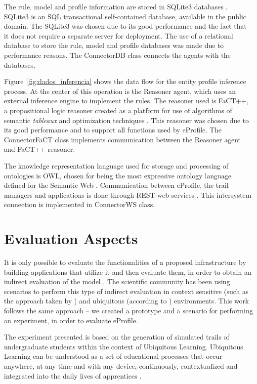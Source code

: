 \documentclass{svjour3}                     %
\begin{document}
The rule, model and profile information are stored in SQLite3 databases \citep{sqlite3}. SQLite3 is an SQL transactional self-contained database, available in the public domain. The SQLite3 was chosen due to its good performance and the fact that it does not require a separate server for deployment. The use of a relational database to store the rule, model and profile databases was made due to performance reasons. The ConnectorDB class connects the agents with the databases.

Figure~\ref{fig:dados_inferencia} shows the data flow for the entity profile
inference process. At the center of this operation is the Reasoner agent, which uses an external inference engine to implement the rules. The reasoner used is FaCT++, a propositional logic reasoner created as a platform for use of algorithms of semantic {\em tableaux} and optimization techniques \citep{tsarkov06}. This reasoner was chosen due to its good performance and to support all functions used by eProfile. The ConnectorFaCT class implements communication between the Reasoner agent and FaCT++ reasoner.

The knowledge representation language used for storage and processing of ontologies is OWL\citep {owl-guide}, chosen for being the most expressive ontology language defined for the Semantic Web \citep{daconta03}. Communication between eProfile, the trail managers and applications is done through REST web services \citep{fielding00}. This intersystem connection is implemented in ConnectorWS class.

\section{Evaluation Aspects}
\label{ch:cenario}

It is only possible to evaluate the functionalities of a proposed infrastructure by building applications that utilize it and then evaluate them, in order to obtain an indirect evaluation of the model \citep{edwards03}. The scientific community has been using scenarios to perform this type of indirect evaluation in context sensitive (such as the approach taken by \citet{dey2001b}) and ubiquitous (according to \citet{satyanarayanan01}) environments. This work follows the same approach -- we created a prototype and a scenario for performing an experiment, in order to evaluate eProfile.

The experiment presented is based on the generation of simulated trails of undergraduate students within the context of Ubiquitous Learning. Ubiquitous Learning can be understood as a set of educational processes that occur anywhere, at any time and with any device, continuously, contextualized and integrated into the daily lives of apprentices \citep{barbosa11}.
\end{document}
